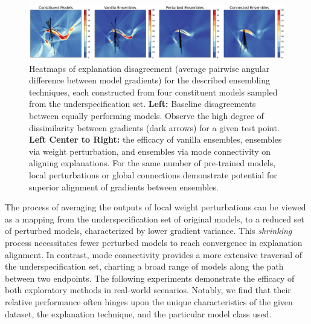 \begin{figure}[t]
    \centering
    \includegraphics[width=\textwidth]{figures/toy_methods.png}
    \caption{\small Heatmaps of explanation disagreement (average pairwise angular difference between model gradients) for the described ensembling techniques, each constructed from four constituent models sampled from the underspecification set. \textbf{Left:} Baseline disagreements between equally performing models. Observe the high degree of dissimilarity between gradients (dark arrows) for a given test point. \textbf{Left Center to Right:} the efficacy of vanilla ensembles, ensembles via weight perturbation, and ensembles via mode connectivity on aligning explanations. For the same number of pre-trained models, local perturbations or global connections demonstrate potential for superior alignment of gradients between ensembles.}
    \label{fig:toy_methods}
\end{figure}

The process of averaging the outputs of local weight perturbations can be viewed as a mapping from the underspecification set of original models, to a reduced set of perturbed models, characterized by lower gradient variance. This \textit{shrinking} process necessitates fewer perturbed models to reach convergence in explanation alignment. In contrast, mode connectivity provides a more extensive traversal of the underspecification set, charting a broad range of models along the path between two endpoints. 
The following experiments demonstrate the efficacy of both exploratory methods in real-world scenarios. Notably, we find that their relative performance often hinges upon the unique characteristics of the given dataset, the explanation technique, and the particular model class used.